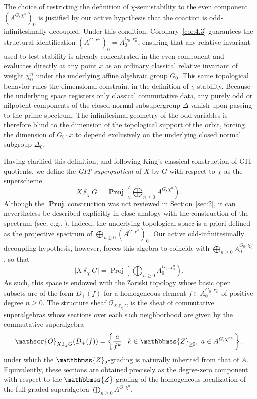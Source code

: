 \documentclass[11pt,a4paper,reqno,noamsfonts]{amsart}
\numberwithin{equation}{section}
\theoremstyle{definition}
\theoremstyle{remark}
\newcommand{\ZZ}{\ensuremath{\mathbbmss{Z}}}
\newcommand{\Ocal}{\ensuremath{\mathscr{O}}}
\DeclareMathOperator{\Proj}{Proj}
\DeclareMathOperator{\sProj}{\mathbf{Proj}}
\begin{document}
The choice of restricting the definition of $\chi$-semistability to the even component $(A^{G,\chi^n})_0$ is justified by our active hypothesis that the coaction is odd-infinitesimally decoupled. Under this condition, Corollary~\ref{cor:4.3} guarantees the structural identification $(A^{G,\chi^n})_0 = A_0^{G_0,\chi_0^n}$, ensuring that any relative invariant used to test stability is already concentrated in the even component and evaluates directly at any point $x$ as an ordinary classical relative invariant of weight $\chi _{0}^{n}$ under the underlying affine algebraic group $G_{0}$. This same topological behavior rules the dimensional constraint in the definition of $\chi$-stability. Because the underlying space registers only classical commutative data, any purely odd or nilpotent components of the closed normal subsupergroup $\Delta$ vanish upon passing to the prime spectrum. The infinitesimal geometry of the odd variables is therefore blind to the dimension of the topological support of the orbit, forcing the dimension of $G_0 \cdot x$ to depend exclusively on the underlying closed normal subgroup $\Delta _{0}$.

Having clarified this definition, and following King's classical construction of GIT quotients, we define the \emph{GIT superquotient} of $X$ by $G$ with respect to $\chi$ as the superscheme
\begin{equation}
X {\sslash_{\chi}} G = \sProj \left( \bigoplus_{n \geq 0} A^{G,\chi^{n}}\right). 
\end{equation}
Although the $\sProj$ construction was not reviewed in Section~\ref{sec:2}, it can nevertheless be described explicitly in close analogy with the construction of the spectrum (see, e.g., \cite{BruzzoHernandezRuiperezPolishchuk2023}). Indeed, the underlying topological space is a priori defined as the projective spectrum of $\bigoplus_{n \geq 0} (A^{G,\chi^{n}})_0$. Our active odd-infinitesimally decoupling hypothesis, however, forces this algebra to coincide with $\bigoplus_{n \geq 0} A_0^{G_0,\chi_0^{n}}$, so that
\begin{equation}
\lvert X {\sslash_{\chi}} G \rvert = \Proj \left( \bigoplus_{n \geq 0} A_0^{G_0,\chi_0^{n}}\right). 
\end{equation}
As such, this space is endowed with the Zariski topology whose basic open subsets are of the form $D_+(f)$ for a homogeneous element $f \in A_0^{G_0,\chi_0^{n}}$ of positive degree $n \geq 0$. The structure sheaf $\Ocal_{X {\sslash_{\chi}} G}$ is the sheaf of commutative superalgebras whose sections over each such neighborhood are given by the commutative superalgebra
\begin{equation}
\Ocal_{X {\sslash_{\chi}} G}(D_+(f)) = \left\{ \frac{a}{f^k} \;\bigg\vert{}\; k \in \ZZ_{\geq 0},\ a \in A^{G,\chi^{kn}} \right\},
\end{equation}
under which the $\ZZ_{2}$-grading is naturally inherited from that of $A$. Equivalently, these sections are obtained precisely as the degree-zero component with respect to the $\ZZ$-grading of the homogeneous localization of the full graded superalgebra $\bigoplus_{n \geq 0} A^{G,\chi^{n}}$.
\end{document}
